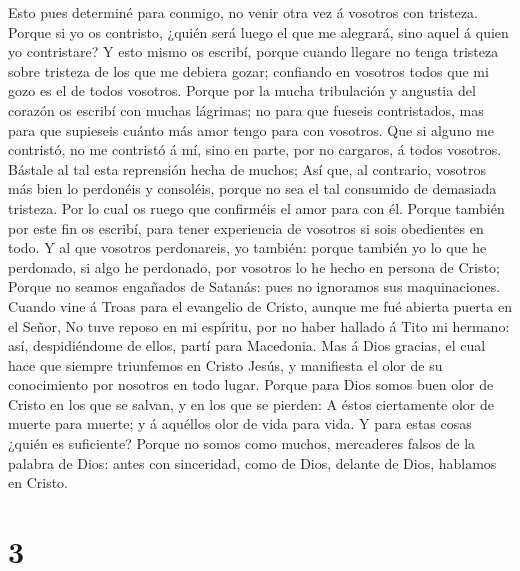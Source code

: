  Esto pues determiné para conmigo, no venir otra vez á
vosotros con tristeza.  Porque si yo os contristo, ¿quién
será luego el que me alegrará, sino aquel á quien yo contristare?
 Y esto mismo os escribí, porque cuando llegare no tenga
tristeza sobre tristeza de los que me debiera gozar; confiando en
vosotros todos que mi gozo es el de todos vosotros. 
Porque por la mucha tribulación y angustia del corazón os escribí con
muchas lágrimas; no para que fueseis contristados, mas para que
supieseis cuánto más amor tengo para con vosotros.  Que si
alguno me contristó, no me contristó á mí, sino en parte, por no
cargaros, á todos vosotros.  Bástale al tal esta
reprensión hecha de muchos;  Así que, al contrario,
vosotros más bien lo perdonéis y consoléis, porque no sea el tal
consumido de demasiada tristeza.  Por lo cual os ruego que
confirméis el amor para con él.  Porque también por este
fin os escribí, para tener experiencia de vosotros si sois obedientes en
todo.  Y al que vosotros perdonareis, yo también: porque
también yo lo que he perdonado, si algo he perdonado, por vosotros lo he
hecho en persona de Cristo;  Porque no seamos engañados
de Satanás: pues no ignoramos sus maquinaciones.  Cuando
vine á Troas para el evangelio de Cristo, aunque me fué abierta puerta
en el Señor,  No tuve reposo en mi espíritu, por no haber
hallado á Tito mi hermano: así, despidiéndome de ellos, partí para
Macedonia.  Mas á Dios gracias, el cual hace que siempre
triunfemos en Cristo Jesús, y manifiesta el olor de su conocimiento por
nosotros en todo lugar.  Porque para Dios somos buen olor
de Cristo en los que se salvan, y en los que se pierden: 
A éstos ciertamente olor de muerte para muerte; y á aquéllos olor de
vida para vida. Y para estas cosas ¿quién es suficiente? 
Porque no somos como muchos, mercaderes falsos de la palabra de Dios:
antes con sinceridad, como de Dios, delante de Dios, hablamos en Cristo.

\hypertarget{section-2}{%
\section{3}\label{section-2}}

